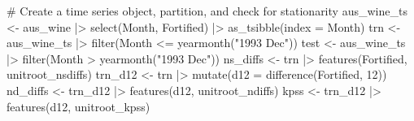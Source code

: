 \documentclass[
  letterpaper,
  DIV=11,
  numbers=noendperiod]{scrartcl}
\newenvironment{Shaded}{\begin{snugshade}}{\end{snugshade}}
\newcommand{\AttributeTok}[1]{\textcolor[rgb]{0.40,0.45,0.13}{#1}}
\newcommand{\CommentTok}[1]{\textcolor[rgb]{0.37,0.37,0.37}{#1}}
\newcommand{\DecValTok}[1]{\textcolor[rgb]{0.68,0.00,0.00}{#1}}
\newcommand{\FunctionTok}[1]{\textcolor[rgb]{0.28,0.35,0.67}{#1}}
\newcommand{\NormalTok}[1]{\textcolor[rgb]{0.00,0.23,0.31}{#1}}
\newcommand{\OtherTok}[1]{\textcolor[rgb]{0.00,0.23,0.31}{#1}}
\newcommand{\SpecialCharTok}[1]{\textcolor[rgb]{0.37,0.37,0.37}{#1}}
\newcommand{\StringTok}[1]{\textcolor[rgb]{0.13,0.47,0.30}{#1}}
\begin{document}
\begin{Shaded}
\begin{Highlighting}[]
\CommentTok{\# Create a time series object, partition, and check for stationarity}
\NormalTok{aus\_wine\_ts }\OtherTok{\textless{}{-}}\NormalTok{ aus\_wine }\SpecialCharTok{|\textgreater{}} \FunctionTok{select}\NormalTok{(Month, Fortified) }\SpecialCharTok{|\textgreater{}} \FunctionTok{as\_tsibble}\NormalTok{(}\AttributeTok{index =}\NormalTok{ Month)}
\NormalTok{trn }\OtherTok{\textless{}{-}}\NormalTok{ aus\_wine\_ts }\SpecialCharTok{|\textgreater{}} \FunctionTok{filter}\NormalTok{(Month }\SpecialCharTok{\textless{}=} \FunctionTok{yearmonth}\NormalTok{(}\StringTok{"1993 Dec"}\NormalTok{))}
\NormalTok{test }\OtherTok{\textless{}{-}}\NormalTok{ aus\_wine\_ts }\SpecialCharTok{|\textgreater{}} \FunctionTok{filter}\NormalTok{(Month }\SpecialCharTok{\textgreater{}} \FunctionTok{yearmonth}\NormalTok{(}\StringTok{"1993 Dec"}\NormalTok{))}
\NormalTok{ns\_diffs }\OtherTok{\textless{}{-}}\NormalTok{ trn }\SpecialCharTok{|\textgreater{}} \FunctionTok{features}\NormalTok{(Fortified, unitroot\_nsdiffs)}
\NormalTok{trn\_d12 }\OtherTok{\textless{}{-}}\NormalTok{ trn }\SpecialCharTok{|\textgreater{}} \FunctionTok{mutate}\NormalTok{(}\AttributeTok{d12 =} \FunctionTok{difference}\NormalTok{(Fortified, }\DecValTok{12}\NormalTok{))}
\NormalTok{nd\_diffs }\OtherTok{\textless{}{-}}\NormalTok{ trn\_d12 }\SpecialCharTok{|\textgreater{}} \FunctionTok{features}\NormalTok{(d12, unitroot\_ndiffs)}
\NormalTok{kpss }\OtherTok{\textless{}{-}}\NormalTok{ trn\_d12 }\SpecialCharTok{|\textgreater{}} \FunctionTok{features}\NormalTok{(d12, unitroot\_kpss)}


\end{Highlighting}
\end{Shaded}
\end{document}
